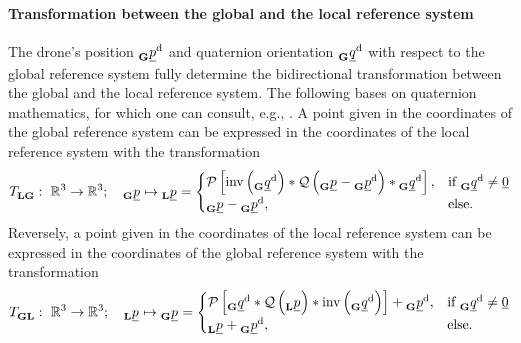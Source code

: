 \paragraph*{Transformation between the global and the local reference system} $\ $\\
The drone's position
$\pos[]{\drone}{}{\grs}{}$
and quaternion orientation
$\quat[]{\drone}{}{\grs}{}$
with respect to the global reference system
fully determine the bidirectional transformation
between the global and the local reference system.
The following bases on quaternion mathematics,
for which one can consult, e.g., \cite{Parent}.
A point given in the coordinates of the global reference system
can be expressed in the coordinates of the local reference system
with the transformation
\begin{align} \label{equ:global_to_local_transformation}
    \trafo[]{}{\lrs\grs}{}{}
    :\ 
    \mathbb{R}^3 \rightarrow \mathbb{R}^3
    ; \quad
    \pos[]{}{}{\grs}{} \mapsto \pos[]{}{}{\lrs}{}
    =
    \begin{cases}
        \mathcal{P} \left[
            \mathrm{inv} \left( \quat[]{\drone}{}{\grs}{} \right)
            *
            \mathcal{Q} \left( \pos[]{}{}{\grs}{} - \pos[]{\drone}{}{\grs}{} \right)
            *
            \quat[]{\drone}{}{\grs}{}
        \right], 
        & \text{if } \quat[]{\drone}{}{\grs}{} \ne \underline 0 \\
        \pos[]{}{}{\grs}{} - \pos[]{\drone}{}{\grs}{}, 
        & \text{else}.
    \end{cases}
\end{align}
Reversely, a point given in the coordinates of the local reference system
can be expressed in the coordinates of the global reference system
with the transformation
\begin{align} \label{eq:local_to_global_transformation}
    \trafo[]{}{\grs\lrs}{}{}
    :\ 
    \mathbb{R}^3 \rightarrow \mathbb{R}^3
    ; \quad
    \pos[]{}{}{\lrs}{} \mapsto \pos[]{}{}{\grs}{}
    =
    \begin{cases}
        \mathcal{P} \left[
            \quat[]{\drone}{}{\grs}{}
            *
            \mathcal{Q} \left( \pos[]{}{}{\lrs}{} \right)
            *
            \mathrm{inv} \left( \quat[]{\drone}{}{\grs}{} \right)
        \right] + \pos[]{\drone}{}{\grs}{}, 
        & \text{if } \quat[]{\drone}{}{\grs}{} \ne \underline 0 \\
        \pos[]{}{}{\lrs}{} + \pos[]{\drone}{}{\grs}{}, 
        & \text{else}.
    \end{cases}
\end{align}
